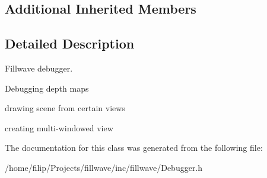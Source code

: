 \subsection*{Additional Inherited Members}


\subsection{Detailed Description}
Fillwave debugger. 


\begin{DoxyItemize}
\item Debugging depth maps
\item drawing scene from certain views
\item creating multi-\/windowed view 
\end{DoxyItemize}

The documentation for this class was generated from the following file\+:\begin{DoxyCompactItemize}
\item 
/home/filip/\+Projects/fillwave/inc/fillwave/Debugger.\+h\end{DoxyCompactItemize}

